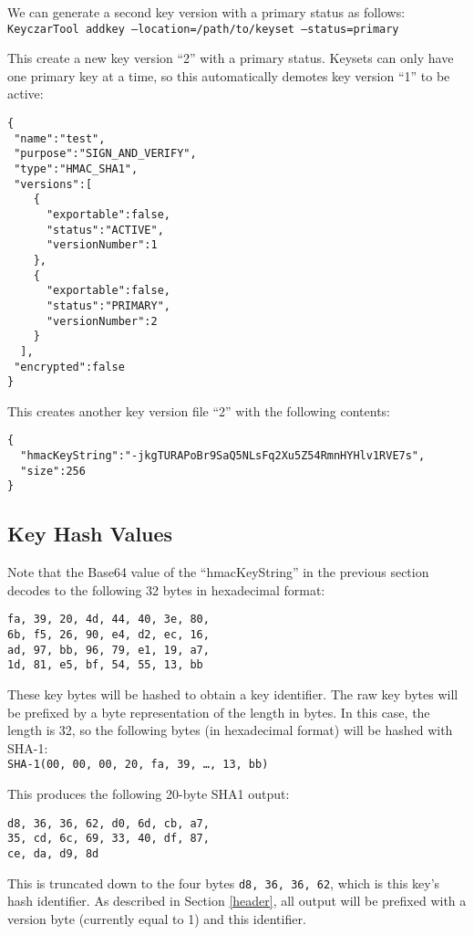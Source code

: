 \documentclass{llncs}
\begin{document}
We can generate a second key version with a primary status as follows: \\
{\tt KeyczarTool addkey --location=/path/to/keyset --status=primary}

This create a new key version ``2'' with a primary status. Keysets can only have
one primary key at a time, so this automatically demotes key version ``1'' to
be active:
\begin{verbatim}
{
 "name":"test",
 "purpose":"SIGN_AND_VERIFY",
 "type":"HMAC_SHA1",
 "versions":[
    { 
      "exportable":false,
      "status":"ACTIVE",
      "versionNumber":1
    },
    { 
      "exportable":false,
      "status":"PRIMARY",
      "versionNumber":2
    }
  ],
 "encrypted":false
}
\end{verbatim}

This creates another key version file ``2'' with the following contents:
\begin{verbatim}
{
  "hmacKeyString":"-jkgTURAPoBr9SaQ5NLsFq2Xu5Z54RmnHYHlv1RVE7s",
  "size":256
}
\end{verbatim}

\subsection{Key Hash Values}

Note that the Base64 value of the ``hmacKeyString'' in the previous
section decodes to the following 32 bytes in hexadecimal format:
\begin{verbatim}
fa, 39, 20, 4d, 44, 40, 3e, 80,
6b, f5, 26, 90, e4, d2, ec, 16,
ad, 97, bb, 96, 79, e1, 19, a7,
1d, 81, e5, bf, 54, 55, 13, bb
\end{verbatim}

These key bytes will be hashed to obtain a key identifier. The raw key bytes
will be prefixed by a byte representation of the length in bytes. In this case,
the length is 32, so the following bytes (in hexadecimal format) will be
hashed with SHA-1:\\ {\tt  SHA-1(00, 00, 00, 20, fa, 39, \ldots, 13, bb)}

This produces the following 20-byte SHA1 output:
\begin{verbatim}
d8, 36, 36, 62, d0, 6d, cb, a7,
35, cd, 6c, 69, 33, 40, df, 87,
ce, da, d9, 8d
\end{verbatim}

This is truncated down to the four bytes {\tt d8, 36, 36, 62}, which is
this key's hash identifier. As described in Section \ref{header}, all output
will be prefixed with a version byte (currently equal to 1) and this identifier.
\end{document}
